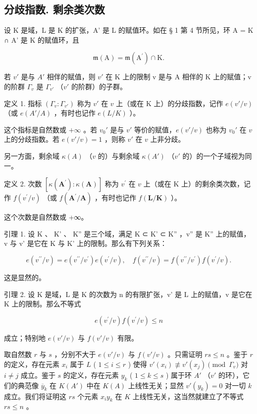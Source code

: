 \subsection{分歧指数. 剩余类次数}

设 K 是域，L 是 K 的扩张，A' 是 L 的赋值环。如在 § 1 第 4 节所见，环 A = K ∩ A' 是 K 的赋值环，且

\[
\mathfrak {m} (\mathrm{A}) = \mathfrak {m} (\mathrm{A} ^ {\prime}) \cap \mathrm{K}.
\]

若 \(v'\) 是与 \(A'\) 相伴的赋值，则 \(v'\) 在 K 上的限制 v 是与 A 相伴的 K 上的赋值；v 的阶群 \(\Gamma_{v}\) 是 \(\Gamma_{v'}\) （\(v'\) 的阶群）的子群。

定义 1. 指标 \((\Gamma_v: \Gamma_{v'})\) 称为 \(v'\) 在 \(v\) 上（或在 K 上）的分歧指数，记作 \(e(v'/v)\) （或 \(e(A'/A)\) ，有时也记作 \(e(L/K)\) ）。

这个指标是自然数或 \(+\infty\) 。若 \(v_0'\) 是与 \(v'\) 等价的赋值，\(e(v'/v)\) 也称为 \(v_0'\) 在 \(v\) 上的分歧指数。若 \(e(v'/v) = 1\) ，则称 \(v'\) 在 \(v\) 上非分歧。

另一方面，剩余域 \(\kappa(A)\) （\(v\) 的）与剩余域 \(\kappa(A')\) （\(v'\) 的）的一个子域视为同一。

定义 2. 次数 \([\kappa (\mathbf{A}^{\prime}):\kappa (\mathbf{A})]\) 称为 \(v^{\prime}\) 在 \(v\) 上（或在 K 上）的剩余类次数，记作 \(f(v^{\prime} / v)\) （或 \(f(\mathbf{A}^{\prime} / \mathbf{A})\) ，有时也记作 \(f(\mathbf{L} / \mathbf{K})\) ）。

这个次数是自然数或 +∞。

引理 1. 设 K 、 K' 、 K'' 是三个域，满足 K ⊂ K' ⊂ K'' ，v'' 是 K'' 上的赋值，v 与 v' 是它在 K 与 K' 上的限制。那么有下列关系：

\[
e (v ^ {\prime \prime} / v) = e (v ^ {\prime \prime} / v ^ {\prime}) e (v ^ {\prime} / v), \quad f (v ^ {\prime \prime} / v) = f (v ^ {\prime \prime} / v ^ {\prime}) f (v ^ {\prime} / v).\tag{1}
\]

这是显然的。

引理 2. 设 K 是域，L 是 K 的次数为 n 的有限扩张，v' 是 L 上的赋值，v 是它在 K 上的限制。那么不等式

\[
e (v ^ {\prime} / v) f (v ^ {\prime} / v) \leqslant n\tag{2}
\]

成立；特别地 \(e(v' / v)\) 与 \(f(v' / v)\) 有限。

取自然数 \(r\) 与 \(s\) ，分别不大于 \(e(v'/v)\) 与 \(f(v'/v)\) 。只需证明 \(rs \leqslant n\) 。鉴于 \(r\) 的定义，存在元素 \(x_i\) 属于 \(L\) ( \(1 \leqslant i \leqslant r\) ) 使得 \(v'(x_i) \not\equiv v'(x_j) \pmod{\Gamma_v}\) 对 \(i \neq j\) 成立。鉴于 \(s\) 的定义，存在元素 \(y_k\) ( \(1 \leqslant k \leqslant s\) ) 属于环 \(A'\) （\(v'\) 的环），它们的典范像 \(\overline{y}_k\) 在 \(K(A')\) 中在 \(K(A)\) 上线性无关；显然 \(v'(y_k) = 0\) 对一切 \(k\) 成立。我们将证明这 \(rs\) 个元素 \(x_i y_k\) 在 \(K\) 上线性无关，这当然就建立了不等式 \(rs \leqslant n\) 。

